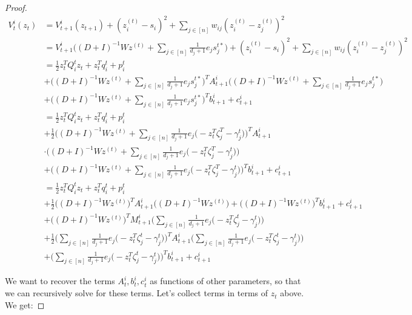 \begin{proof}
\begin{align*}
V_t^i(z_t) &= 
V_{t+1}^{i}(z_{t+1})
+ (z_i^{(t)} - s_i)^2 + \sum_{j \in [n]} w_{ij} (z_i^{(t)} - z_j^{(t)})^2 \\
&= V_{t+1}^{i}
\bigg(
(D + I)^{-1} W z^{(t)} + \sum_{j \in [n]} \frac{1}{d_{j} + 1} e_j s_j^{t * }
\bigg)
+ (z_i^{(t)} - s_i)^2 + \sum_{j \in [n]} w_{ij} (z_i^{(t)} - z_j^{(t)})^2 \\
&= \frac 1 2 z_t^T Q_i^t z_t + z_t^T q_i^t + p_i^t \\
&+ \bigg(
(D + I)^{-1} W z^{(t)} + \sum_{j \in [n]} \frac{1}{d_{j} + 1} e_j s_j^{t * }
\bigg)^T A_{t+1}^{i} \bigg(
(D + I)^{-1} W z^{(t)} + \sum_{j \in [n]} \frac{1}{d_{j} + 1} e_j s_j^{t * }
\bigg) \\
&+ \bigg(
(D + I)^{-1} W z^{(t)} + \sum_{j \in [n]} \frac{1}{d_{j} + 1} e_j s_j^{t * }
\bigg)^T b_{t+1}^{i} 
+ c_{t+1}^{i} \\
&= \frac 1 2 z_t^T Q_i^t z_t + z_t^T q_i^t + p_i^t \\
&+ \frac 1 2 \bigg(
(D + I)^{-1} W z^{(t)} + \sum_{j \in [n]} \frac{1}{d_{j} + 1} e_j 
\big(
-z_t^T \zeta_j^T - \gamma_j^t
\big)
\bigg)^T A_{t+1}^{i} \\
&\cdot \bigg(
(D + I)^{-1} W z^{(t)} + \sum_{j \in [n]} \frac{1}{d_{j} + 1} e_j 
\big(
-z_t^T \zeta_j^T - \gamma_j^t
\big)
\bigg) \\
&+ \bigg(
(D + I)^{-1} W z^{(t)} + \sum_{j \in [n]} \frac{1}{d_{j} + 1} e_j 
\big(
-z_t^T \zeta_j^T - \gamma_j^t
\big)
\bigg)^T b_{t+1}^{i} 
+ c_{t+1}^{i} \\
&= \frac 1 2 z_t^T Q_i^t z_t + z_t^T q_i^t + p_i^t \\
&+ \frac 1 2 \bigg(
(D + I)^{-1} W z^{(t)} 
\bigg)^T A_{t+1}^{i} \bigg(
(D + I)^{-1} W z^{(t)}
\bigg) 
+ \bigg(
(D + I)^{-1} W z^{(t)} 
\bigg)^T b_{t+1}^i 
+ c_{t+1}^i \\
&+ \bigg(
(D + I)^{-1} W z^{(t)} 
\bigg)^T M_{t+1}^{i} 
\bigg(
\sum_{j \in [n]} \frac{1}{d_{j} + 1} e_j 
\big(
-z_t^T \zeta_j^t - \gamma_j^t
\big)
\bigg) \\
&+ \frac 1 2 \bigg(
\sum_{j \in [n]} \frac{1}{d_{j} + 1} e_j 
\big(
-z_t^T \zeta_j^t - \gamma_j^t
\big)
\bigg)^T A_{t+1}^i
\bigg(
\sum_{j \in [n]} \frac{1}{d_{j} + 1} e_j 
\big(
-z_t^T \zeta_j^t - \gamma_j^t
\big)
\bigg) \\
&+
\bigg(
\sum_{j \in [n]} \frac{1}{d_{j} + 1} e_j 
\big(
-z_t^T \zeta_j^t - \gamma_j^t
\big)
\bigg)^T b_{t+1}^i + c_{t+1}^{i} 
\end{align*}

We want to recover the terms $A_t^i, b_t^i, c_t^i$ as functions of other parameters, so that we can recursively solve for these terms. Let's collect terms in terms of $z_t$ above. We get: 


\end{proof}
